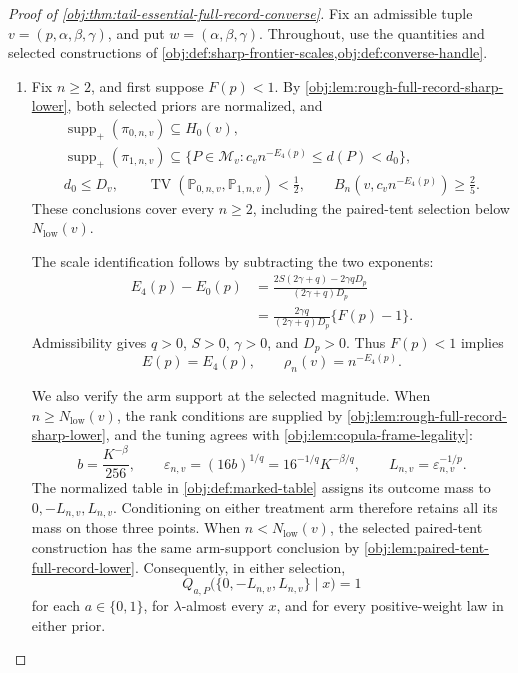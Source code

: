 \documentclass[11pt]{article}
\begin{document}
\begin{proof}[Proof of \cref{obj:thm:tail-essential-full-record-converse}]
Fix an admissible tuple \(v=(p,\alpha,\beta,\gamma)\), and put
\(w=(\alpha,\beta,\gamma)\). Throughout, use the quantities and selected
constructions of
\cref{obj:def:sharp-frontier-scales,obj:def:converse-handle}.

\begin{enumerate}
\item
Fix \(n\ge2\), and first suppose \(F(p)<1\).
By \cref{obj:lem:rough-full-record-sharp-lower}, both selected priors are
normalized, and
\[
\begin{gathered}
\operatorname{supp}_+(\pi_{0,n,v})\subseteq H_0(v),\\
\operatorname{supp}_+(\pi_{1,n,v})
\subseteq
\{P\in\mathcal M_v:c_vn^{-E_4(p)}\le d(P)<d_0\},\\
d_0\le D_v,\qquad
\operatorname{TV}(\mathbb P_{0,n,v},\mathbb P_{1,n,v})<\frac12,\qquad
B_n(v,c_vn^{-E_4(p)})\ge\frac25.
\end{gathered}
\]
These conclusions cover every \(n\ge2\), including the paired-tent
selection below \(N_{\mathrm{low}}(v)\).

The scale identification follows by subtracting the two exponents:
\[
\begin{aligned}
E_4(p)-E_0(p)
&=
\frac{2S(2\gamma+q)-2\gamma qD_p}
     {(2\gamma+q)D_p}\\
&=
\frac{2\gamma q}{(2\gamma+q)D_p}\{F(p)-1\}.
\end{aligned}
\]
Admissibility gives \(q>0\), \(S>0\), \(\gamma>0\), and \(D_p>0\).
Thus \(F(p)<1\) implies
\[
E(p)=E_4(p),\qquad \rho_n(v)=n^{-E_4(p)}.
\]

We also verify the arm support at the selected magnitude. When
\(n\ge N_{\mathrm{low}}(v)\), the rank conditions are supplied by
\cref{obj:lem:rough-full-record-sharp-lower}, and the tuning agrees with
\cref{obj:lem:copula-frame-legality}:
\[
b=\frac{K^{-\beta}}{256},\qquad
\varepsilon_{n,v}=(16b)^{1/q}
=16^{-1/q}K^{-\beta/q},\qquad
L_{n,v}=\varepsilon_{n,v}^{-1/p}.
\]
The normalized table in \cref{obj:def:marked-table} assigns its outcome
mass to \(0,-L_{n,v},L_{n,v}\). Conditioning on either treatment arm
therefore retains all its mass on those three points. When
\(n<N_{\mathrm{low}}(v)\), the selected paired-tent construction has the
same arm-support conclusion by
\cref{obj:lem:paired-tent-full-record-lower}. Consequently, in either
selection,
\[
Q_{a,P}\bigl(\{0,-L_{n,v},L_{n,v}\}\mid x\bigr)=1
\]
for each \(a\in\{0,1\}\), for \(\lambda\)-almost every \(x\), and for every
positive-weight law in either prior.


\end{enumerate}
\end{proof}
\end{document}
